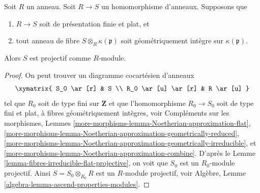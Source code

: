 \begin{lemma}
\label{lemma-fibres-irreducible-flat-projective-nonnoetherian}
Soit $R$ un anneau. Soit $R \to S$ un homomorphisme d'anneaux.
Supposons que
\begin{enumerate}
\item $R \to S$ soit de présentation finie et plat, et
\item tout anneau de fibre $S \otimes_R \kappa(\mathfrak p)$ soit
géométriquement intègre sur $\kappa(\mathfrak p)$.
\end{enumerate}
Alors $S$ est projectif comme $R$-module.
\end{lemma}

\begin{proof}
On peut trouver un diagramme cocartésien d'anneaux
$$
\xymatrix{
S_0 \ar[r] & S \\
R_0 \ar[u] \ar[r] & R \ar[u]
}
$$
tel que $R_0$ soit de type fini sur $\mathbf{Z}$ et que l'homomorphisme
$R_0 \to S_0$ soit de type fini et plat, à fibres géométriquement
intègres, voir
Compléments sur les morphismes,
Lemmes \ref{more-morphisms-lemma-Noetherian-approximation-flat},
\ref{more-morphisms-lemma-Noetherian-approximation-geometrically-reduced},
\ref{more-morphisms-lemma-Noetherian-approximation-geometrically-irreducible},
et \ref{more-morphisms-lemma-Noetherian-approximation-combine}.
D'après le
Lemme \ref{lemma-fibres-irreducible-flat-projective},
on voit que $S_0$ est un $R_0$-module projectif. Ainsi $S = S_0 \otimes_{R_0} R$
est un $R$-module projectif, voir
Algèbre, Lemme \ref{algebra-lemma-ascend-properties-modules}.
\end{proof}

